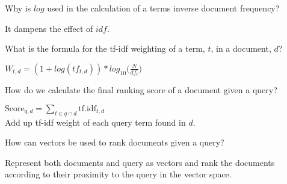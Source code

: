 \documentclass[2by4,grid]{flashcards}
\begin{document}
\begin{flashcard}{Why is $log$ used in the calculation of a terms inverse document frequency?}
	\begin{center}
        It dampens the effect of $idf$.
	\end{center}
\end{flashcard}

\begin{flashcard}{}
	\begin{center}

	\end{center}
\end{flashcard}

\begin{flashcard}{What is the formula for the tf-idf weighting of a term, $t$, in a document, $d$?}
	\begin{center}
        $W_{t,d} = (1+ log(tf_{t,d})) * log_{10}\Big(\frac{N}{df_{t}}\Big)$
	\end{center}
\end{flashcard}

\begin{flashcard}{How do we calculate the final ranking score of a document given a query?}
	\begin{center}
        $\text{Score}_{q,d} = \sum\nolimits_{t \in q \cap d} \text{tf.idf}_{t,d}$ \\ \vspace{.4cm}
        Add up tf-idf weight of each query term found in $d$.
	\end{center}
\end{flashcard}

\begin{flashcard}{How can vectors be used to rank documents given a query?}
	\begin{center}
        Represent both documents and query as vectors and rank the documents according to their proximity to the query in the vector space.
	\end{center}
\end{flashcard}
\end{document}
